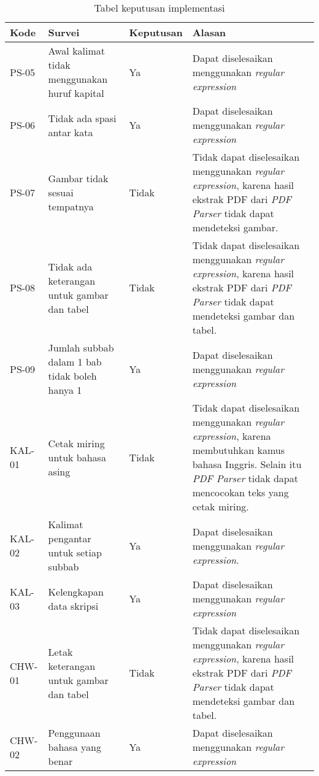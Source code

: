 \begin{table}[H]
	\caption {Tabel keputusan implementasi} \label{tab:keputusan}
	\begin{center}
		\begin{tabular}{|p{1.5 cm}|>{\raggedright} p{4 cm}| p{2 cm}| p{7 cm}|}
		\hline
		Kode & Survei & Keputusan & Alasan \\ 
		\hline 
		PS-05 & Awal kalimat tidak menggunakan huruf kapital & Ya & Dapat diselesaikan menggunakan \textit{regular expression} \newline \\ 
		\hline
		PS-06 & Tidak ada spasi antar kata & Ya & Dapat diselesaikan menggunakan \textit{regular expression} \newline \\ 
		\hline 
		PS-07 & Gambar tidak sesuai tempatnya & Tidak & Tidak dapat diselesaikan menggunakan \textit{regular expression}, karena hasil ekstrak PDF dari \textit{PDF Parser} tidak dapat mendeteksi gambar. \newline \\ 
		\hline 
		PS-08 & Tidak ada keterangan untuk gambar dan tabel & Tidak & Tidak dapat diselesaikan menggunakan \textit{regular expression}, karena hasil ekstrak PDF dari \textit{PDF Parser} tidak dapat mendeteksi gambar dan tabel. \newline \\ 
		\hline 
		PS-09 & Jumlah subbab dalam 1 bab tidak boleh hanya 1 & Ya & Dapat diselesaikan menggunakan \textit{regular expression} \newline \\ 
		\hline 
		KAL-01 & Cetak miring untuk bahasa asing & Tidak & Tidak dapat diselesaikan menggunakan \textit{regular expression}, karena membutuhkan kamus bahasa Inggris. Selain itu \textit{PDF Parser} tidak dapat mencocokan teks yang cetak miring. \newline \\ 
		\hline 
		KAL-02 & Kalimat pengantar untuk setiap subbab & Ya & Dapat diselesaikan menggunakan \textit{regular expression}. \newline \\ 
		\hline 
		KAL-03 & Kelengkapan data skripsi & Ya & Dapat diselesaikan menggunakan \textit{regular expression} \newline \\ 
		\hline 
		CHW-01 & Letak keterangan untuk gambar dan tabel & Tidak & Tidak dapat diselesaikan menggunakan \textit{regular expression}, karena hasil ekstrak PDF dari \textit{PDF Parser} tidak dapat mendeteksi gambar dan tabel.\newline \\ 
		\hline 
		CHW-02 & Penggunaan bahasa yang benar & Ya & Dapat diselesaikan menggunakan \textit{regular expression} \newline \\ 
		\hline  
		\end{tabular}
	\end{center}
\end{table}

